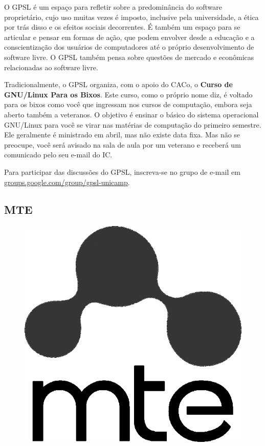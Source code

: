 O GPSL é um espaço para refletir sobre a predominância do software proprietário,
cujo uso muitas vezes é imposto, inclusive pela universidade, a ética por trás
disso e os efeitos sociais decorrentes. É também um espaço para se articular e
pensar em formas de ação, que podem envolver desde a educação e a
conscientização dos usuários de computadores até o próprio desenvolvimento de
software livre. O GPSL também pensa sobre questões de mercado e econômicas
relacionadas ao software livre.

Tradicionalmente, o GPSL organiza, com o apoio do CACo, o \textbf{Curso de
GNU/Linux Para os Bixos}. Este curso, como o próprio nome diz, é voltado para os
bixos como você que ingressam nos cursos de computação, embora seja aberto
também a veteranos. O objetivo é ensinar o básico do sistema operacional
GNU/Linux para você se virar nas matérias de computação do primeiro semestre.
Ele geralmente é ministrado em abril, mas não existe data fixa. Mas não se
preocupe, você será avisado na sala de aula por um veterano e receberá um
comunicado pelo seu e-mail do IC.

Para participar das discussões do GPSL, inscreva-se no grupo de e-mail em
\url{groups.google.com/group/gpsl-unicamp}.

\subsection{MTE}

\begin{figure}[H]
    \centering
    \includegraphics[scale=0.40]{img/alem_da_graduacao/mte_logo.png}
\end{figure}

